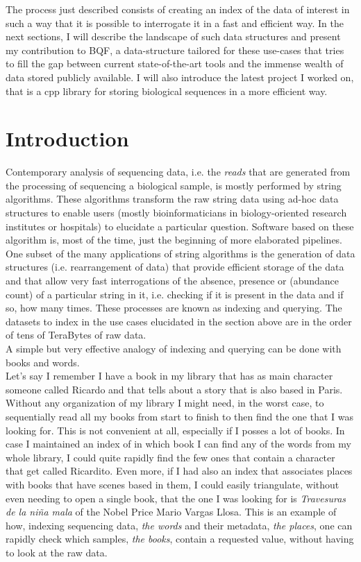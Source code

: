 The process just described consists of creating an index of the data of interest in such a way that it is possible to interrogate it in a fast and efficient way. In the next sections, I will describe the landscape of such data structures and present my contribution to BQF, a data-structure tailored for these use-cases that tries to fill the gap between current state-of-the-art tools and the immense wealth of data stored publicly available. I will also introduce the latest project I worked on, that is a cpp library for storing biological sequences in a more efficient way.

\section{Introduction}
Contemporary analysis of sequencing data, i.e. the \emph{reads} that are generated from the processing of sequencing a biological sample, is mostly performed by string algorithms. These algorithms transform the raw string data using ad-hoc data structures to enable users (mostly bioinformaticians in biology-oriented research institutes or hospitals) to elucidate a particular question. Software based on these algorithm is, most of the time, just the beginning of more elaborated pipelines. \\
One subset of the many applications of string algorithms is the generation of data structures (i.e. rearrangement of data) that provide efficient storage of the data and that allow very fast interrogations of the absence, presence or (abundance count) of a particular string in it, i.e. checking if it is present in the data and if so, how many times. These processes are known as indexing and querying. The datasets to index in the use cases elucidated in the section above are in the order of tens of TeraBytes of raw data.\\
A simple but very effective analogy of indexing and querying can be done with books and words. \\
Let's say I remember I have a book in my library that has as main character someone called Ricardo and that tells about a story that is also based in Paris. Without any organization of my library I might need, in the worst case, to sequentially read all my books from start to finish to then find the one that I was looking for. This is not convenient at all, especially if I posses a lot of books. In case I maintained an index of in which book I can find any of the words from my whole library, I could quite rapidly find the few ones that contain a character that get called Ricardito. Even more, if I had also an index that associates places with books that have scenes based in them, I could easily triangulate, without even needing to open a single book, that the one I was looking for is \emph{Travesuras de la niña mala} of the Nobel Price  Mario Vargas Llosa.
This is an example of how, indexing sequencing data, \emph{the words} and their metadata, \emph{the places}, one can rapidly check which samples, \emph{the books}, contain a requested value, without having to look at the raw data.

